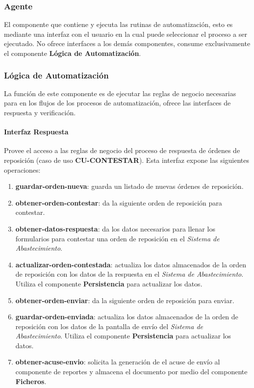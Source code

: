 \subsubsection{Agente}
El componente que contiene y ejecuta las rutinas de automatización, esto es mediante una interfaz con el usuario en la cual puede seleccionar el proceso a ser ejecutado. No ofrece interfaces a los demás componentes, consume exclusivamente el componente \textbf{Lógica de Automatización}.

\subsubsection{Lógica de Automatización}\label{sec:logica-auto}
La función de este componente es de ejecutar las reglas de negocio necesarias para en los flujos de los procesos de automatización, ofrece las interfaces de respuesta y verificación.
\paragraph{\indent Interfaz Respuesta\\}
Provee el acceso a las reglas de negocio del proceso de respuesta de órdenes de reposición (caso de uso \textbf{CU-CONTESTAR}). Esta interfaz expone las siguientes operaciones:
\begin{enumerate}
	\item \textbf{guardar-orden-nueva}: guarda un listado de nuevas órdenes de reposición.
	\item \textbf{obtener-orden-contestar}: da la siguiente orden de reposición para contestar.
	\item \textbf{obtener-datos-respuesta}: da los datos necesarios para llenar los formularios para contestar una orden de reposición en el \textit{Sistema de Abastecimiento}.
	\item \textbf{actualizar-orden-contestada}: actualiza los datos almacenados de la orden de reposición con los datos de la respuesta en el \textit{Sistema de Abastecimiento}. Utiliza el componente \textbf{Persistencia} para actualizar los datos.
	\item \textbf{obtener-orden-enviar}: da la siguiente orden de reposición para enviar.
	\item \textbf{guardar-orden-enviada}: actualiza los datos almacenados de la orden de reposición con los datos de la pantalla de envío del \textit{Sistema de Abastecimiento}. Utiliza el componente \textbf{Persistencia} para actualizar los datos.
	\item \textbf{obtener-acuse-envio}: solicita la generación de el acuse de envío al componente de reportes y almacena el documento por medio del componente \textbf{Ficheros}.
\end{enumerate}

